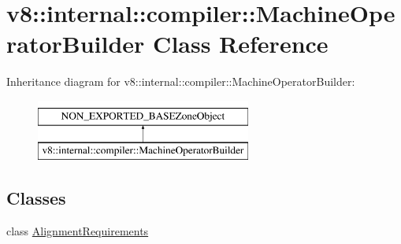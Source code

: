 \hypertarget{classv8_1_1internal_1_1compiler_1_1MachineOperatorBuilder}{}\section{v8\+:\+:internal\+:\+:compiler\+:\+:Machine\+Operator\+Builder Class Reference}
\label{classv8_1_1internal_1_1compiler_1_1MachineOperatorBuilder}
Inheritance diagram for v8\+:\+:internal\+:\+:compiler\+:\+:Machine\+Operator\+Builder\+:\begin{figure}[H]
\begin{center}
\leavevmode
\includegraphics[height=2.000000cm]{classv8_1_1internal_1_1compiler_1_1MachineOperatorBuilder}
\end{center}
\end{figure}
\subsection*{Classes}
\begin{DoxyCompactItemize}
\item 
class \mbox{\hyperlink{classv8_1_1internal_1_1compiler_1_1MachineOperatorBuilder_1_1AlignmentRequirements}{Alignment\+Requirements}}
\end{DoxyCompactItemize}
